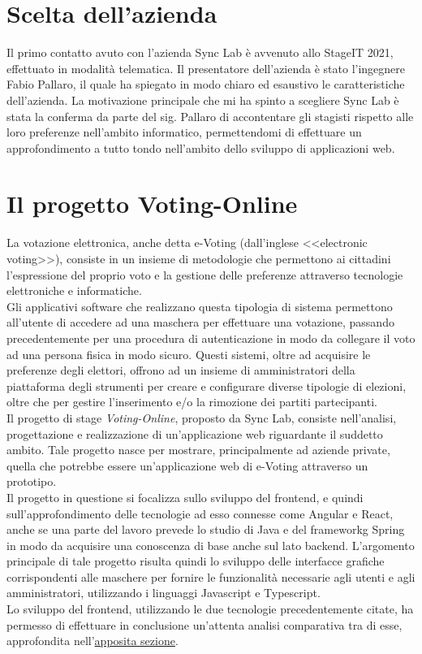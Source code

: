 \section{Scelta dell'azienda}

Il primo contatto avuto con l'azienda Sync Lab è avvenuto allo StageIT 2021, effettuato in modalità telematica. Il presentatore dell'azienda è stato l’ingegnere Fabio Pallaro, il quale ha spiegato in modo chiaro ed esaustivo le caratteristiche dell'azienda. La motivazione principale che mi ha spinto a scegliere Sync Lab è stata la conferma da parte del sig. Pallaro di accontentare gli stagisti rispetto alle loro preferenze nell'ambito informatico, permettendomi di effettuare un approfondimento a tutto tondo nell'ambito dello sviluppo di applicazioni web.

\section{Il progetto Voting-Online}

La votazione elettronica, anche detta e-Voting (dall'inglese <<electronic voting>>), consiste in un insieme di metodologie che permettono ai cittadini l'espressione del proprio voto e la gestione delle preferenze attraverso tecnologie elettroniche e informatiche. \\
Gli applicativi software che realizzano questa tipologia di sistema permettono all'utente di accedere ad una maschera per effettuare una votazione, passando precedentemente per una procedura di autenticazione in modo da collegare il voto ad una persona fisica in modo sicuro. Questi sistemi, oltre ad acquisire le preferenze degli elettori, offrono ad un insieme di amministratori della piattaforma degli strumenti per creare e configurare diverse tipologie di elezioni, oltre che per gestire l'inserimento e/o la rimozione dei partiti partecipanti. \\
Il progetto di stage \textit{Voting-Online}, proposto da Sync Lab, consiste nell'analisi, progettazione e realizzazione di un’applicazione web riguardante il suddetto ambito. Tale progetto nasce per mostrare, principalmente ad aziende private, quella che potrebbe essere un'applicazione web di e-Voting attraverso un prototipo. \\
Il progetto in questione si focalizza sullo sviluppo del \gls{frontend}, e quindi sull'approfondimento delle tecnologie ad esso connesse come Angular e React, anche se una parte del lavoro prevede lo studio di Java e del \gls{frameworkg} Spring in modo da acquisire una conoscenza di base anche sul lato \gls{backend}.
L'argomento principale di tale progetto risulta quindi lo sviluppo delle interfacce grafiche corrispondenti alle maschere per fornire le funzionalità necessarie agli utenti e agli amministratori, utilizzando i linguaggi Javascript e Typescript. \\
Lo sviluppo del \gls{frontend}, utilizzando le due tecnologie precedentemente citate, ha permesso di effettuare in conclusione un'attenta analisi comparativa tra di esse, approfondita nell'{\hyperref[cap:angular-react]{apposita sezione}}.

